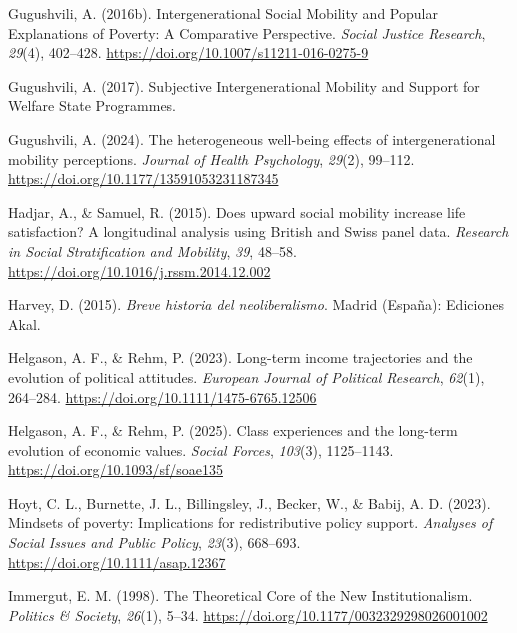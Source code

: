 \documentclass[
  13pt,
]{article}
\newlength{\cslhangindent}
\newenvironment{CSLReferences}[2] %
 {\begin{list}{}{%
  \setlength{\itemindent}{0pt}
  \setlength{\leftmargin}{0pt}
  \setlength{\parsep}{0pt}
  \ifodd #1
   \setlength{\leftmargin}{\cslhangindent}
   \setlength{\itemindent}{-1\cslhangindent}
  \fi
  \setlength{\itemsep}{#2\baselineskip}}}
 {\end{list}}
\begin{document}
\begin{CSLReferences}{1}{0}
Gugushvili, A. (2016b). Intergenerational {Social Mobility} and {Popular
Explanations} of {Poverty}: {A Comparative Perspective}. \emph{Social
Justice Research}, \emph{29}(4), 402--428.
\url{https://doi.org/10.1007/s11211-016-0275-9}

Gugushvili, A. (2017). Subjective {Intergenerational Mobility} and
{Support} for {Welfare State Programmes}.

Gugushvili, A. (2024). The heterogeneous well-being effects of
intergenerational mobility perceptions. \emph{Journal of Health
Psychology}, \emph{29}(2), 99--112.
\url{https://doi.org/10.1177/13591053231187345}

Hadjar, A., \& Samuel, R. (2015). Does upward social mobility increase
life satisfaction? {A} longitudinal analysis using {British} and {Swiss}
panel data. \emph{Research in Social Stratification and Mobility},
\emph{39}, 48--58. \url{https://doi.org/10.1016/j.rssm.2014.12.002}

Harvey, D. (2015). \emph{{Breve historia del neoliberalismo}}. Madrid
(Espa{ñ}a): Ediciones Akal.

Helgason, A. F., \& Rehm, P. (2023). Long-term income trajectories and
the evolution of political attitudes. \emph{European Journal of
Political Research}, \emph{62}(1), 264--284.
\url{https://doi.org/10.1111/1475-6765.12506}

Helgason, A. F., \& Rehm, P. (2025). Class experiences and the long-term
evolution of economic values. \emph{Social Forces}, \emph{103}(3),
1125--1143. \url{https://doi.org/10.1093/sf/soae135}

Hoyt, C. L., Burnette, J. L., Billingsley, J., Becker, W., \& Babij, A.
D. (2023). Mindsets of poverty: {Implications} for redistributive policy
support. \emph{Analyses of Social Issues and Public Policy},
\emph{23}(3), 668--693. \url{https://doi.org/10.1111/asap.12367}

Immergut, E. M. (1998). The {Theoretical Core} of the {New
Institutionalism}. \emph{Politics \& Society}, \emph{26}(1), 5--34.
\url{https://doi.org/10.1177/0032329298026001002}


\end{CSLReferences}
\end{document}

